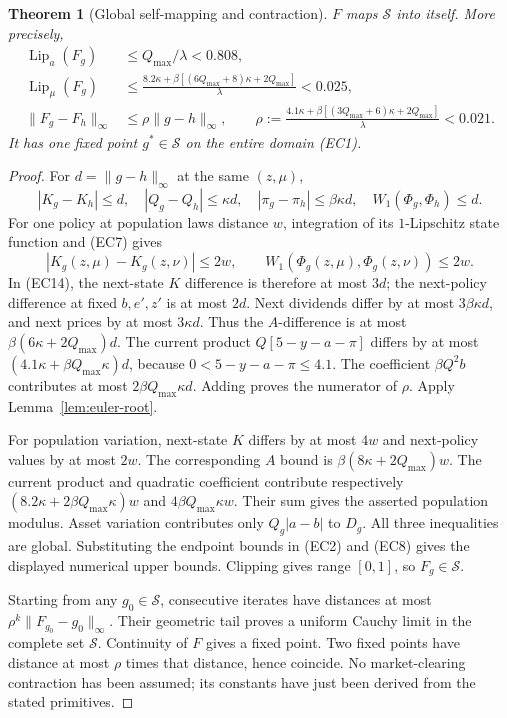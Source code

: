 \documentclass[11pt,a4paper]{article}
\newtheorem{theorem}{Theorem}
\begin{document}
\begin{theorem}[Global self-mapping and contraction]\label{thm:economy-contraction}
$F$ maps $\mathcal S$ into itself. More precisely,
\begin{align*}
 \operatorname{Lip}_a(F_g)&\leq Q_{\max}/\lambda<0.808,\\
 \operatorname{Lip}_\mu(F_g)&\leq
 \frac{8.2\kappa+\beta[(6Q_{\max}+8)\kappa+2Q_{\max}]}\lambda<0.025,\\
 \|F_g-F_h\|_\infty&\leq \rho\|g-h\|_\infty,\qquad
 \rho:=\frac{4.1\kappa+\beta[(3Q_{\max}+6)\kappa+2Q_{\max}]}\lambda<0.021.
 \tag{EC13}
\end{align*}
It has one fixed point $g^*\in\mathcal S$ on the entire domain
\textup{(EC1)}.
\end{theorem}
\begin{proof}
For $d=\|g-h\|_\infty$ at the same $(z,\mu)$,
\[
 |K_g-K_h|\leq d,\quad |Q_g-Q_h|\leq\kappa d,
 \quad |\pi_g-\pi_h|\leq\beta\kappa d,
 \quad W_1(\Phi_g,\Phi_h)\leq d.
 \tag{EC14}
\]
For one policy at population laws distance $w$, integration of its
$1$-Lipschitz state function and \textup{(EC7)} gives
\[
 |K_g(z,\mu)-K_g(z,\nu)|\leq2w,
 \qquad W_1(\Phi_g(z,\mu),\Phi_g(z,\nu))\leq2w.
 \tag{EC15}
\]
In \textup{(EC14)}, the next-state $K$ difference is therefore at most
$3d$; the next-policy difference at fixed $b,e',z'$ is at most $2d$.
Next dividends differ by at most $3\beta\kappa d$, and next prices by
at most $3\kappa d$. Thus the $A$-difference is at most
$\beta(6\kappa+2Q_{\max})d$. The current product $Q[5-y-a-\pi]$
differs by at most $(4.1\kappa+\beta Q_{\max}\kappa)d$, because
$0<5-y-a-\pi\leq4.1$. The coefficient $\beta Q^2b$ contributes at most
$2\beta Q_{\max}\kappa d$. Adding proves the numerator of $\rho$.
Apply Lemma~\ref{lem:euler-root}.

For population variation, next-state $K$ differs by at most $4w$ and
next-policy values by at most $2w$. The corresponding $A$ bound is
$\beta(8\kappa+2Q_{\max})w$. The current product and quadratic
coefficient contribute respectively
$(8.2\kappa+2\beta Q_{\max}\kappa)w$ and
$4\beta Q_{\max}\kappa w$. Their sum gives the asserted population
modulus. Asset variation contributes only $Q_g|a-b|$ to $D_g$.
All three inequalities are global. Substituting the endpoint bounds in
\textup{(EC2)} and \textup{(EC8)} gives the displayed numerical upper
bounds. Clipping gives range $[0,1]$, so $F_g\in\mathcal S$.

Starting from any $g_0\in\mathcal S$, consecutive iterates have distances
at most $\rho^k\|F_{g_0}-g_0\|_\infty$. Their geometric tail proves a
uniform Cauchy limit in the complete set $\mathcal S$. Continuity of $F$
gives a fixed point. Two fixed points have distance at most $\rho$ times
that distance, hence coincide. No market-clearing contraction has been
assumed; its constants have just been derived from the stated primitives.
\end{proof}
\end{document}
